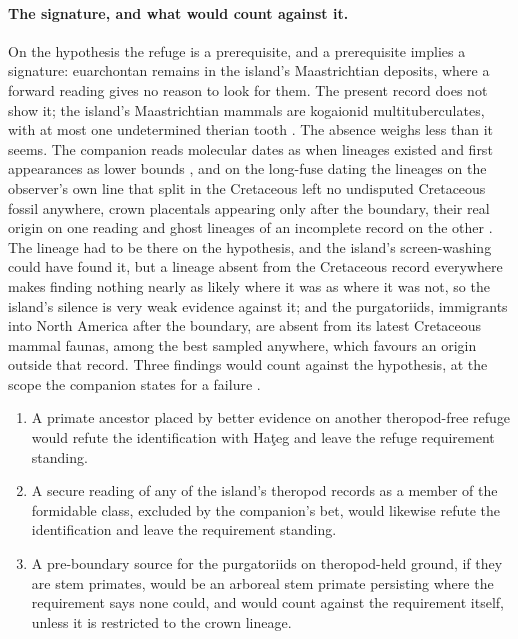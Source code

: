 \documentclass[11pt]{article}
\theoremstyle{definition}
\begin{document}
\paragraph{The signature, and what would count against it.} On the hypothesis the refuge is a prerequisite, and a prerequisite implies a signature: euarchontan remains in the island's Maastrichtian deposits, where a forward reading gives no reason to look for them. The present record does not show it; the island's Maastrichtian mammals are kogaionid multituberculates, with at most one undetermined therian tooth \cite{SmithCodrea2015kogaionids}. The absence weighs less than it seems. The companion reads molecular dates as when lineages existed and first appearances as lower bounds \cite{Nexus}, and on the long-fuse dating the lineages on the observer's own line that split in the Cretaceous left no undisputed Cretaceous fossil anywhere, crown placentals appearing only after the boundary, their real origin on one reading \cite{OLeary2013} and ghost lineages of an incomplete record on the other \cite{Springer2019}. The lineage had to be there on the hypothesis, and the island's screen-washing could have found it, but a lineage absent from the Cretaceous record everywhere makes finding nothing nearly as likely where it was as where it was not, so the island's silence is very weak evidence against it; and the purgatoriids, immigrants into North America after the boundary, are absent from its latest Cretaceous mammal faunas, among the best sampled anywhere, which favours an origin outside that record. Three findings would count against the hypothesis, at the scope the companion states for a failure \cite{Nexus}.
\begin{enumerate}
\item A primate ancestor placed by better evidence on another theropod-free refuge would refute the identification with Ha\c{t}eg and leave the refuge requirement standing.
\item A secure reading of any of the island's theropod records as a member of the formidable class, excluded by the companion's bet, would likewise refute the identification and leave the requirement standing.
\item A pre-boundary source for the purgatoriids on theropod-held ground, if they are stem primates, would be an arboreal stem primate persisting where the requirement says none could, and would count against the requirement itself, unless it is restricted to the crown lineage.
\end{enumerate}
\end{document}
